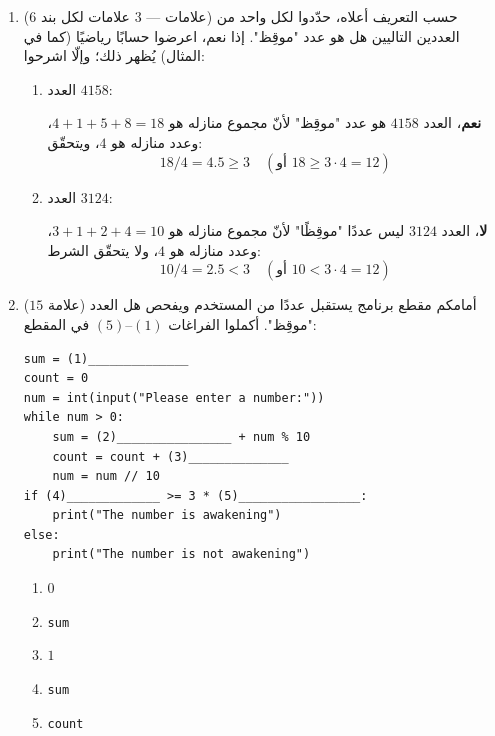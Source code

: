\documentclass[14pt]{extarticle}
\begin{document}
\begin{enumerate}[label=\textbf{السؤال \arabic*:}, wide=0pt, itemsep=2.2em]
\begin{enumerate}[label=\alph*., itemsep=1.5em]
\item ($6$ علامات — $3$ علامات لكل بند) حسب التعريف أعلاه، حدّدوا لكل واحد من العددين التاليين هل هو عدد "موقِظ". إذا نعم، اعرضوا حسابًا رياضيًا (كما في المثال) يُظهر ذلك؛ وإلّا اشرحوا:
\begin{enumerate}[label=\arabic*., itemsep=1em]
\item العدد $4158$:
\ifwithsols
\begin{boxSolution}
\textbf{نعم}، العدد $4158$ هو عدد "موقِظ" لأنّ مجموع منازله هو $4 + 1 + 5 + 8 = 18$، وعدد منازله هو $4$، ويتحقّق:
$$18 / 4 = 4.5 \geq 3 \quad (\text{أو } 18 \geq 3 \cdot 4 = 12)$$
\end{boxSolution}
\else
\hrulefill
\fi

\item العدد $3124$:
\ifwithsols
\begin{boxSolution}
\textbf{لا}، العدد $3124$ ليس عددًا "موقِظًا" لأنّ مجموع منازله هو $3 + 1 + 2 + 4 = 10$، وعدد منازله هو $4$، ولا يتحقّق الشرط:
$$10 / 4 = 2.5 < 3 \quad (\text{أو } 10 < 3 \cdot 4 = 12)$$
\end{boxSolution}
\else
\hrulefill
\fi
\end{enumerate}
\filbreak

\item ($15$ علامة) أمامكم مقطع برنامج يستقبل عددًا من المستخدم ويفحص هل العدد "موقِظ". أكملوا الفراغات $(1)$–$(5)$ في المقطع:

\begin{boxCode}
\begin{english}
\begin{verbatim}
sum = (1)______________
count = 0
num = int(input("Please enter a number:"))
while num > 0:
    sum = (2)________________ + num % 10
    count = count + (3)______________
    num = num // 10
if (4)_____________ >= 3 * (5)_________________:
    print("The number is awakening")
else:
    print("The number is not awakening")
\end{verbatim}
\end{english}
\end{boxCode}

\ifwithsols
\begin{boxSolution}
\begin{enumerate}[label=(\arabic*)]
\item $0$
\item \textenglish{\texttt{sum}}
\item $1$
\item \textenglish{\texttt{sum}}
\item \textenglish{\texttt{count}}
\end{enumerate}
\end{boxSolution}
\fi
\filbreak
\end{enumerate}
\filbreak

\end{enumerate}
\end{document}
